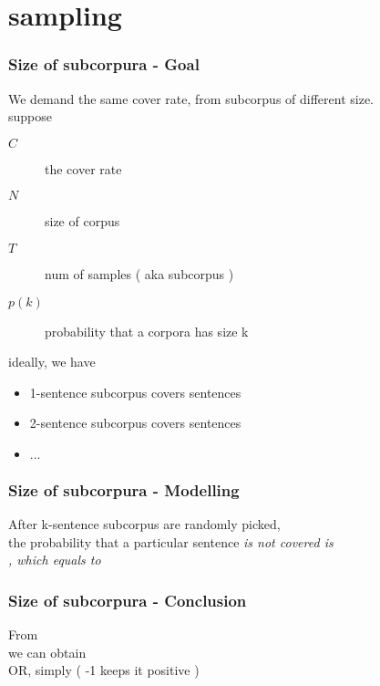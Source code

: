 \section{sampling}{

  \begin{frame}
    \frametitle{Size of subcorpura - Goal}
    We demand the same cover rate, from subcorpus of different size. \\
    suppose
    \begin{description}
      \item[$C$]     the cover rate
      \item[$N$]     size of corpus
      \item[$T$]     num of samples ( aka subcorpus )
      \item[$p(k)$]  probability that a corpora has size k
    \end{description}
    ideally, we have
    \begin{itemize}
      \item {} 1-sentence subcorpus covers  sentences
      \item {} 2-sentence subcorpus covers  sentences
      \item $ ... $
    \end{itemize}
  \end{frame}

  \begin{frame} \frametitle{Size of subcorpura - Modelling}
    After  k-sentence subcorpus are randomly picked,
    \\
    the probability that a particular sentence \em{is not covered} is
    \\
    , which equals to 
  \end{frame}

  \begin{frame} \frametitle{Size of subcorpura - Conclusion}
    From 
    \\
    we can obtain 
    \\
    OR, simply   ( -1 keeps it positive )
  \end{frame}

}

